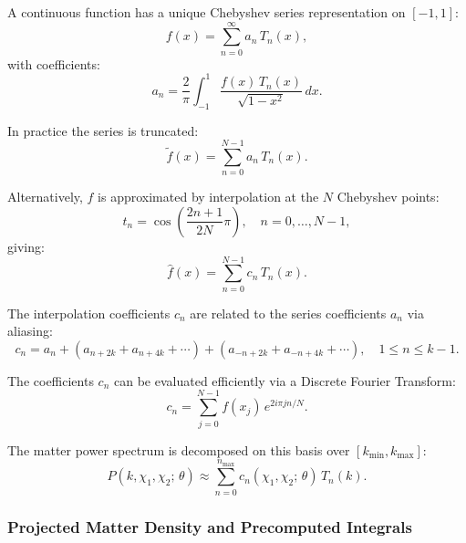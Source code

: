 A continuous function has a unique Chebyshev series representation on $[-1,1]$:
\begin{equation}
    f(x) = \sum_{n=0}^\infty a_n\,T_n(x),
\end{equation}
with coefficients:
\begin{equation}
    a_n = \frac{2}{\pi}\int_{-1}^{1}\frac{f(x)\,T_n(x)}{\sqrt{1-x^2}}\,dx.
\end{equation}

In practice the series is truncated:
\begin{equation}
    \tilde{f}(x) = \sum_{n=0}^{N-1} a_n\,T_n(x).
\end{equation}

Alternatively, $f$ is approximated by interpolation at the $N$ Chebyshev points:
\begin{equation}
    t_n = \cos\!\left(\frac{2n+1}{2N}\pi\right), \quad n=0,\ldots,N-1,
\end{equation}
giving:
\begin{equation}
    \hat{f}(x) = \sum_{n=0}^{N-1} c_n\,T_n(x).
    \label{eq:cheb_interp}
\end{equation}

The interpolation coefficients $c_n$ are related to the series coefficients
$a_n$ via aliasing:
\begin{equation}
    c_n = a_n + (a_{n+2k} + a_{n+4k} + \cdots)
    + (a_{-n+2k} + a_{-n+4k} + \cdots), \quad 1\le n\le k-1.
\end{equation}

The coefficients $c_n$ can be evaluated efficiently via a Discrete Fourier
Transform:
\begin{equation}
    c_n = \sum_{j=0}^{N-1} f(x_j)\,e^{2i\pi jn/N}.
\end{equation}

The matter power spectrum is decomposed on this basis over
$[k_{\min}, k_{\max}]$:
\begin{equation}
    P(k,\chi_1,\chi_2;\,\theta) \approx
    \sum_{n=0}^{n_{\max}} c_n(\chi_1,\chi_2;\,\theta)\,T_n(k).
    \label{eq:Pk_cheb}
\end{equation}

\subsubsection{Projected Matter Density and Precomputed Integrals}

